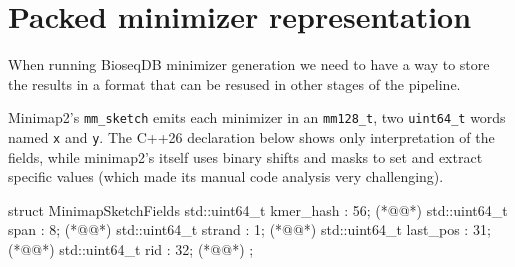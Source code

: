 
\section{Packed minimizer representation}
\label{sec:packed-minimizer-representation}

When running BioseqDB minimizer generation we need to have a way to store the results in a format that can be resused in other stages of the pipeline.

Minimap2's \texttt{mm\_sketch} emits each minimizer in an \texttt{mm128\_t},
two \texttt{uint64\_t} words named \texttt{x} and \texttt{y}.  The C++26
declaration below shows only interpretation of the fields, while minimap2's itself uses binary shifts and masks to set and extract specific values (which made its manual code analysis very challenging).

\begin{BioseqCppSnippet}[caption={Logical fields packed into a minimap2 minimizer.},label={lst:minimap-minimizer-cpp-decl}]
struct MinimapSketchFields {
  std::uint64_t kmer_hash : 56; (*@@*)
  std::uint64_t span      :  8; (*@@*)
  std::uint64_t strand    :  1; (*@@*)
  std::uint64_t last_pos  : 31; (*@@*)
  std::uint64_t rid       : 32; (*@@*)
};
\end{BioseqCppSnippet}


